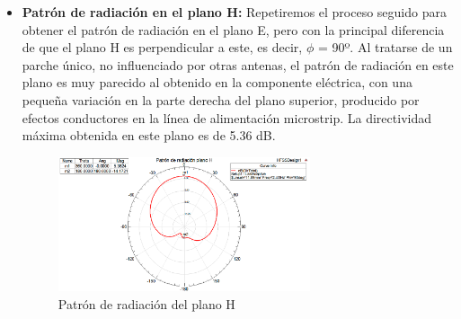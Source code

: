 \begin{itemize}
\item \textbf{Patrón de radiación en el plano H: }Repetiremos el proceso seguido para obtener el patrón de radiación en el plano E, pero con la principal diferencia de que el plano H es perpendicular a este, es decir, $\phi $ = 90º. Al tratarse de un parche único, no influenciado por otras antenas, el patrón de radiación en este plano es muy parecido al obtenido en la componente eléctrica, con una pequeña variación en la parte derecha del plano superior, producido por efectos conductores en la línea de alimentación microstrip. La directividad máxima obtenida en este plano es de 5.36 dB.
	\begin{figure}[H]
    \centering
        \includegraphics[width=0.7\textwidth]{archivos/analisis/1x11/5}
        \caption{Patrón de radiación del plano H}
        \label{fig:radH}
	\end{figure}


\end{itemize}
